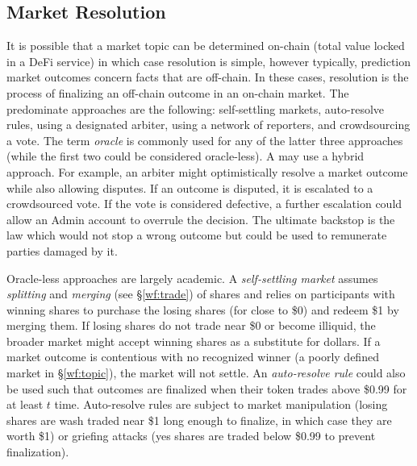 
\subsection{Market Resolution}\label{wf:close}

It is possible that a market topic can be determined on-chain (\eg total value locked in a DeFi service) in which case resolution is simple, however typically, prediction market outcomes concern facts that are off-chain. In these cases, resolution is the process of finalizing an off-chain outcome in an on-chain market. The predominate approaches are the following: self-settling markets, auto-resolve rules, using a designated arbiter, using a network of reporters, and crowdsourcing a vote. The term \textit{oracle} is commonly used for any of the latter three approaches (while the first two could be considered oracle-less). A \depm may use a hybrid approach. For example, an arbiter might optimistically resolve a market outcome while also allowing disputes. If an outcome is disputed, it is escalated to a crowdsourced vote. If the vote is considered defective, a further escalation could allow an Admin account to overrule the decision. The ultimate backstop is the law which would not stop a wrong outcome but could be used to remunerate parties damaged by it.

Oracle-less approaches are largely academic. A \textit{self-settling market} assumes \textit{splitting} and \textit{merging} (see \S\ref{wf:trade}) of shares and relies on participants with winning shares to purchase the losing shares (for close to \$0) and redeem \$1 by merging them. If losing shares do not trade near \$0 or become illiquid, the broader market might accept winning shares as a substitute for dollars. If a market outcome is contentious with no recognized winner (\eg a poorly defined market in \S\ref{wf:topic}), the market will not settle. An \textit{auto-resolve rule} could also be used such that outcomes are finalized when their token trades above \$0.99 for at least $t$ time. Auto-resolve rules are subject to market manipulation (losing shares are wash traded near \$1 long enough to finalize, in which case they are worth \$1) or griefing attacks (yes shares are traded below \$0.99 to prevent finalization). 






